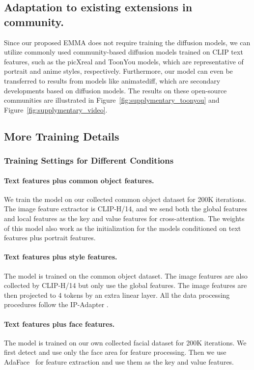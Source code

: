 \subsection{Adaptation to existing extensions in community.} 
Since our proposed EMMA does not require training the diffusion models, we can utilize commonly used community-based diffusion models trained on CLIP text features, such as the picXreal and ToonYou models, which are representative of portrait and anime styles, respectively. Furthermore, our model can even be transferred to results from models like animatediff, which are secondary developments based on diffusion models. The results on these open-source communities are illustrated in Figure~\ref{fig:supplymentary_toonyou} and Figure~\ref{fig:supplymentary_video}.

\subsection{More Training Details}

\subsubsection{Training Settings for Different Conditions}
\paragraph{Text features plus common object features.} We train the model on our collected common object dataset for 200K iterations. The image feature extractor is CLIP-H/14, and we send both the global features and local features as the key and value features for cross-attention. The weights of this model also work as the initialization for the models conditioned on text features plus portrait features. 

\paragraph{Text features plus style features.} The model is trained on the common object dataset. The image features are also collected by CLIP-H/14 but only use the global features. The image features are then projected to 4 tokens by an extra linear layer. All the data processing procedures follow the IP-Adapter \cite{ye2023ip}.

\paragraph{Text features plus face features.} The model is trained on our own collected facial dataset for 200K iterations. We first detect and use only the face area for feature processing. Then we use AdaFace~\cite{kim2022adaface} for feature extraction and use them as the key and value features.


